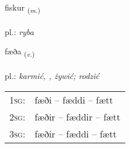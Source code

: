 \documentclass[frontgrid, backgrid]{flacards}\usepackage[]{graphicx}\usepackage[]{xcolor}
\begin{document}
\renewcommand{\flhead}{\vskip5pt \fboxsep=0pt {\small\bfseries\footnotesize Nafnorð | Noun}}
\renewcommand{\fcfoot}{\vskip5pt \fboxsep=0pt \hspace{2pt}{\small\bfseries\footnotesize 1K}}

\renewcommand{\blhead}{\vskip5pt {\small\bfseries\footnotesize Nafnorð | Noun }}
\renewcommand{\bcfoot}{\vskip5pt \hspace{2pt}{\small\bfseries\footnotesize 1K}}


{fiskur \small{\textsubscript{(\textit{m.})}} \\[1ex] %
\textphonetic{[fɪskʏr]} \\
pl.: \emph{ryba} \\  [2ex]
\renewcommand*{\arraystretch}{0.8}
}

\renewcommand{\flhead}{\vskip5pt \fboxsep=0pt {\small\bfseries\footnotesize Sagnorð | Verb}}
\renewcommand{\fcfoot}{\vskip5pt \fboxsep=0pt \hspace{2pt}{\small\bfseries\footnotesize 1K}}

\renewcommand{\blhead}{\vskip5pt {\small\bfseries\footnotesize Sagnorð | Verb }}
\renewcommand{\bcfoot}{\vskip5pt \hspace{2pt}{\small\bfseries\footnotesize 1K}}


{fæða \small{\textsubscript{(\textit{v.})}} \\[1ex] %
\textphonetic{[faiːða]} \\
pl.: \emph{karmić, , żywić; rodzić} \\  [2ex]
\renewcommand*{\arraystretch}{0.8}
\begin{tabular}{p{1cm}l}
\textsc{1sg}: & fæði -- fæddi -- fætt \\ 
\textsc{2sg}: & fæðir -- fæddir -- fætt \\ 
\textsc{3sg}: & fæðir -- fæddi -- fætt \\ 
\end{tabular}
}
\end{document}

